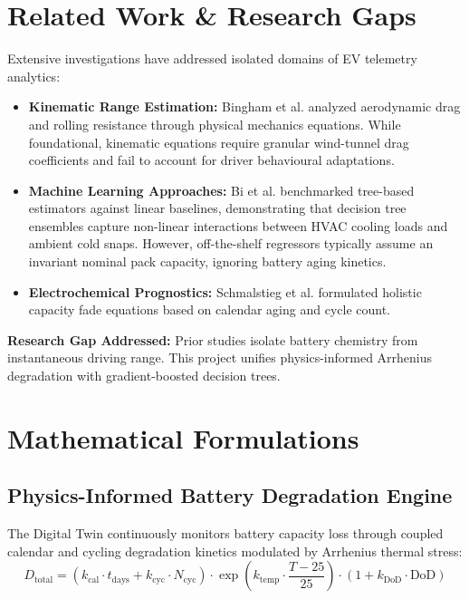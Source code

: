 \documentclass[journal]{IEEEtran}
\begin{document}
\section{Related Work \& Research Gaps}
Extensive investigations have addressed isolated domains of EV telemetry analytics:
\begin{itemize}
    \item \textbf{Kinematic Range Estimation:} Bingham et al. \cite{bingham2012} analyzed aerodynamic drag and rolling resistance through physical mechanics equations. While foundational, kinematic equations require granular wind-tunnel drag coefficients and fail to account for driver behavioural adaptations.
    \item \textbf{Machine Learning Approaches:} Bi et al. \cite{bi2020} benchmarked tree-based estimators against linear baselines, demonstrating that decision tree ensembles capture non-linear interactions between HVAC cooling loads and ambient cold snaps. However, off-the-shelf regressors typically assume an invariant nominal pack capacity, ignoring battery aging kinetics.
    \item \textbf{Electrochemical Prognostics:} Schmalstieg et al. \cite{schmalstieg2014} formulated holistic capacity fade equations based on calendar aging and cycle count.
\end{itemize}

\textbf{Research Gap Addressed:} Prior studies isolate battery chemistry from instantaneous driving range. This project unifies physics-informed Arrhenius degradation with gradient-boosted decision trees.

\section{Mathematical Formulations}

\subsection{Physics-Informed Battery Degradation Engine}
The Digital Twin continuously monitors battery capacity loss through coupled calendar and cycling degradation kinetics modulated by Arrhenius thermal stress:
\begin{equation}
D_{\text{total}} = (k_{\text{cal}} \cdot t_{\text{days}} + k_{\text{cyc}} \cdot N_{\text{cyc}}) \cdot \exp\left(k_{\text{temp}} \cdot \frac{T - 25}{25}\right) \cdot (1 + k_{\text{DoD}} \cdot \text{DoD})
\end{equation}
\end{document}
